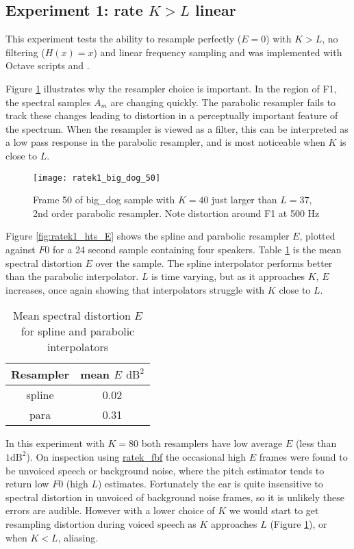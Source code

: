 \documentclass{article}
\begin{document}
\subsection{Experiment 1: rate $K>L$ linear}

This experiment tests the ability to resample perfectly ($E=0$) with $K>L$, no filtering ($H(x)=x$) and linear frequency sampling and was implemented with Octave scripts  and .

Figure \ref{fig:ratek1_big_dog_50} illustrates why the resampler choice is important.  In the region of F1, the spectral samples $A_{m}$ are changing quickly.  The parabolic resampler fails to track these changes leading to distortion in a perceptually important feature of the spectrum.  When the resampler is viewed as a filter, this can be interpreted as a low pass response in the parabolic resampler, and is most noticeable when $K$ is close to $L$.

\begin{figure}[h]
\caption{Frame 50 of big\_dog sample with $K=40$ just larger than $L=37$, 2nd order parabolic resampler.  Note distortion around F1 at 500 Hz }
\label{fig:ratek1_big_dog_50}
\begin{center}
\texttt{[image: ratek1\_big\_dog\_50]}
\end{center}
\end{figure}

Figure \ref{fig:ratek1_hts_E} shows the spline and parabolic resampler $E$, plotted against $F0$ for a 24 second sample containing four speakers.  Table \ref{table:ratek1_mean_E} is the mean spectral distortion $E$ over the sample.  The spline interpolator performs better than the parabolic interpolator.  $L$ is time varying, but as it approaches $K$, $E$ increases, once again showing that interpolators struggle with $K$ close to $L$.

\begin{table}[h]
\centering
\begin{tabular}{c c }
 \hline
 Resampler & mean $E$ $\textrm{dB}^2$ \\
 \hline
 spline & 0.02 \\ 
 para  & 0.31 \\
 \hline
\end{tabular}
\caption{Mean spectral distortion $E$ for spline and parabolic interpolators}\label{table:ratek1_mean_E}
\end{table}

In this experiment with $K=80$ both resamplers have low average $E$ (less than $1 \textrm{dB}^2$). On inspection using \url{ratek_fbf} the occasional high $E$ frames were found to be unvoiced speech or background noise, where the pitch estimator tends to return low $F0$ (high $L$) estimates.  Fortunately the ear is quite insensitive to spectral distortion in unvoiced of background noise frames, so it is unlikely these errors are audible.  However with a lower choice of $K$ we would start to get resampling distortion during voiced speech as $K$ approaches $L$ (Figure \ref{fig:ratek1_big_dog_50}), or when $K<L$, aliasing.
\end{document}

